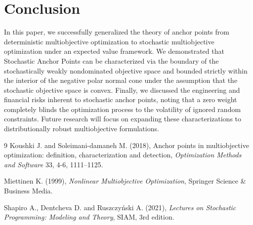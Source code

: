 \documentclass[twoside]{article}
\begin{document}
\section{Conclusion}
In this paper, we successfully generalized the theory of anchor points from deterministic multiobjective optimization to stochastic multiobjective optimization under an expected value framework. We demonstrated that Stochastic Anchor Points can be characterized via the boundary of the stochastically weakly nondominated objective space and bounded strictly within the interior of the negative polar normal cone under the assumption that the stochastic objective space is convex. Finally, we discussed the engineering and financial risks inherent to stochastic anchor points, noting that a zero weight completely blinds the optimization process to the volatility of ignored random constraints. Future research will focus on expanding these characterizations to distributionally robust multiobjective formulations.


\begin{thebibliography}{9}
Koushki J. and Soleimani-damaneh M. (2018), Anchor points in multiobjective optimization: definition, characterization and detection,
{\it Optimization Methods and Software} 33, 4-6, 1111--1125.

Miettinen K. (1999), {\it Nonlinear Multiobjective Optimization}, Springer Science \& Business Media.

Shapiro A., Dentcheva D. and Ruszczy{\'n}ski A. (2021), {\it Lectures on Stochastic Programming: Modeling and Theory}, SIAM, 3rd edition.

\end{thebibliography}
 
\end{document}
